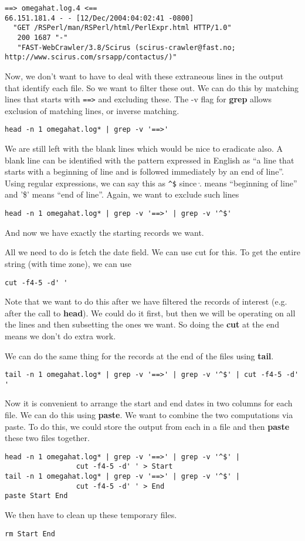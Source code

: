 \documentclass[10pt]{article}
\def\executable#1{\textbf{#1}}
\begin{document}
\begin{enumerate}
{\begin{verbatim}
==> omegahat.log.4 <==
66.151.181.4 - - [12/Dec/2004:04:02:41 -0800] 
  "GET /RSPerl/man/RSPerl/html/PerlExpr.html HTTP/1.0"
   200 1687 "-" 
   "FAST-WebCrawler/3.8/Scirus (scirus-crawler@fast.no; http://www.scirus.com/srsapp/contactus/)"
\end{verbatim}
}
Now, we don't want to have to deal with these extraneous lines in the
output that identify each file.
So we want to filter these out.
We can do this by matching lines that starts with \verb+==>+
and excluding these. The -v flag for \executable{grep} 
allows exclusion of matching lines, or inverse matching.
\begin{verbatim}
head -n 1 omegahat.log* | grep -v '==>'
\end{verbatim}
We are still left with the blank lines which would be nice to
eradicate also.
A blank line can be identified with the pattern
expressed in English as 
``a line that starts with a beginning of line and is followed
immediately by an end of line''.
Using regular expressions, we can say this as
\verb+^$+ since
$\hat.$ means ``beginning of line'' and '\$' means ``end of line''.
Again, we want to exclude such lines
\begin{verbatim}
head -n 1 omegahat.log* | grep -v '==>' | grep -v '^$'
\end{verbatim}
And now we have exactly the starting records we want. 

All we need to do is fetch the date field.
We can use cut for this.
To get the entire string (with time zone), we can use 
\begin{verbatim}
cut -f4-5 -d' '
\end{verbatim}
Note that we want to do this after we have filtered the records of
interest (e.g. after the call to \executable{head}).  We could do it
first, but then we will be operating on all the lines and then
subsetting the ones we want. So doing the \executable{cut} at the end
means we don't do extra work.

We can do the same thing for the records at the end
of the files using \executable{tail}.
\begin{verbatim}
tail -n 1 omegahat.log* | grep -v '==>' | grep -v '^$' | cut -f4-5 -d' '
\end{verbatim}

Now it is convenient to arrange the start and end dates
in two columns for each file.
We can do this using \executable{paste}.
We want to combine the two computations via paste.
To do this, we could store the output from each
in a file and then \executable{paste} these
two files together.
\begin{verbatim}
head -n 1 omegahat.log* | grep -v '==>' | grep -v '^$' | 
                 cut -f4-5 -d' ' > Start
tail -n 1 omegahat.log* | grep -v '==>' | grep -v '^$' |
                 cut -f4-5 -d' ' > End
paste Start End
\end{verbatim}
We then have to clean up these temporary files.
\begin{verbatim}
rm Start End
\end{verbatim}


\end{enumerate}
\end{document}
